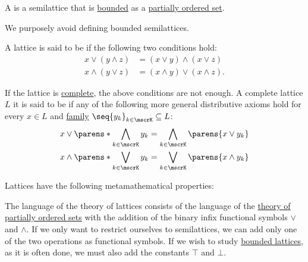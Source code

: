 \begin{definition}
\begin{thmenum}[series=def:semilattice]
     A  is a semilattice that is \hyperref[def:extremal_points/top_and_bottom]{bounded} as a \hyperref[def:partially_ordered_set]{partially ordered set}.

    We purposely avoid defining bounded semilattices.

     A lattice is said to be  if the following two conditions hold:
    \begin{align}
      x \vee (y \wedge z) &= (x \vee y) \wedge (x \vee z) \label{eq:def:semilattice/distributive_lattice/finite/join_over_meet} \\
      x \wedge (y \vee z) &= (x \wedge y) \vee (x \wedge z) \label{eq:def:semilattice/distributive_lattice/finite/meet_over_join}.
    \end{align}

    If the lattice is \hyperref[def:semilattice/complete]{complete}, the above conditions are not enough. A complete lattice \( L \) it is said to be  if any of the following more general distributive axioms hold for every \( x \in L \) and \hyperref[def:cartesian_product/indexed_family]{family} \( \seq{ y_k }_{k \in \mscrK} \subseteq L \):
    \begin{align}
      x \vee \parens*{ \bigwedge_{k \in \mscrK} y_k } &= \bigwedge_{k \in \mscrK} \parens{ x \vee y_k } \label{eq:def:semilattice/distributive_lattice/arbitrary/join_over_meet} \\
      x \wedge \parens*{ \bigvee_{k \in \mscrK} y_k } &= \bigvee_{k \in \mscrK} \parens{ x \wedge y_k } \label{eq:def:semilattice/distributive_lattice/arbitrary/meet_over_join}
    \end{align}
  \end{thmenum}

  Lattices have the following metamathematical properties:
  \begin{thmenum}[resume=def:semilattice]
     The language of the theory of lattices consists of the language of the \hyperref[def:partially_ordered_set]{theory of partially ordered sets} with the addition of the binary infix functional symbols \( \vee \) and \( \wedge \). If we only want to restrict ourselves to semilattices, we can add only one of the two operations as functional symbols. If we wish to study \hyperref[def:semilattice/bounded]{bounded lattices}, as it is often done, we must also add the constants \( \top \) and \( \bot \).


\end{thmenum}
\end{definition}
